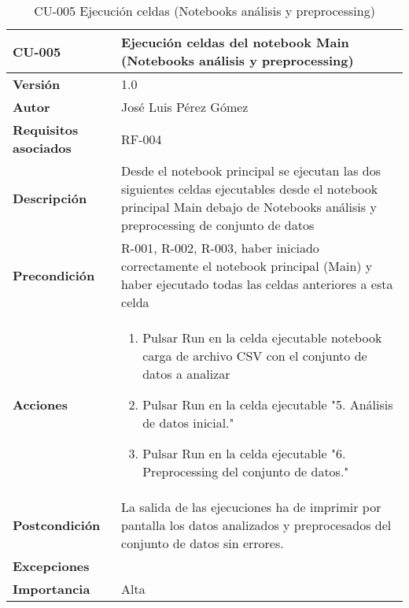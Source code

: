\begin{table}[p]
	\centering
	\begin{tabularx}{\linewidth}{ p{} p{} }
		\toprule
		\textbf{CU-005}    & \textbf{Ejecución celdas del notebook Main (Notebooks análisis y preprocessing)}\\
		\toprule
		\textbf{Versión}              & 1.0    \\
		\textbf{Autor}                & José Luis Pérez Gómez \\
		\textbf{Requisitos asociados} & RF-004 \\
		\textbf{Descripción}          & Desde el notebook principal se ejecutan las dos siguientes celdas ejecutables desde el notebook principal Main debajo de Notebooks análisis y preprocessing de conjunto de datos\\
		\textbf{Precondición}         & R-001, R-002, R-003, haber iniciado correctamente el notebook principal (Main) y haber ejecutado todas las celdas anteriores a esta celda\\
		\textbf{Acciones}             &
		\begin{enumerate}
			\def\labelenumi{\arabic{enumi}.}
			\tightlist
			\item Pulsar Run en la celda ejecutable notebook carga de archivo CSV con el conjunto de datos a analizar
			\item Pulsar Run en la celda ejecutable "5. Análisis de datos inicial."
			\item Pulsar Run en la celda ejecutable "6. Preprocessing del conjunto de datos."
		\end{enumerate}\\
		\textbf{Postcondición}        & La salida de las ejecuciones ha de imprimir por pantalla los datos analizados y preprocesados del conjunto de datos sin errores.\\
		\textbf{Excepciones}          &  \\
		\textbf{Importancia}          & Alta \\
		\bottomrule
	\end{tabularx}
	\caption{CU-005 Ejecución celdas (Notebooks análisis y preprocessing)}
\end{table}


